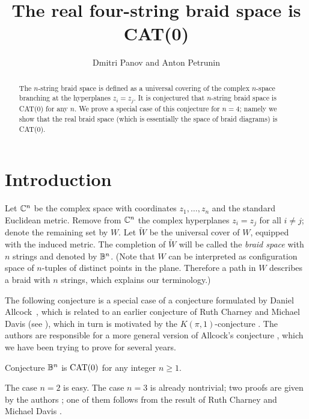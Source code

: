 \documentclass[a4paper,10pt]{article}
\def\thetitle{The real four-string braid space is CAT(0)}
\def\theauthors{Dmitri Panov and Anton Petrunin}
\begin{document}
\title{\thetitle}
\author{\theauthors}
\date{}
\maketitle

\begin{abstract}
The $n$-string braid space is defined as a universal covering of the complex $n$-space branching at the hyperplanes $z_i=z_j$.
It is conjectured that $n$-string braid space is CAT(0) for any $n$.
We prove a special case of this conjecture for $n=4$; namely we show that the real braid space (which is essentially the space of braid diagrams) is CAT(0).
\end{abstract}

\section{Introduction}

Let $\mathbb{C}^n$ be the complex space
with coordinates $z_1,\dots,z_n$ and the standard Euclidean metric.
Remove from $\mathbb{C}^n$ the complex hyperplanes $z_i=z_j$ for all $i\ne j$;
denote the remaining set by $W$.
Let $\tilde W$ be the universal cover of $W$, equipped with the induced metric.
The completion of $\tilde W$ will be called the \emph{braid space}
with $n$ strings and denoted by $\mathbb{B}^n$.
(Note that $W$ can be interpreted as configuration space of $n$-tuples of distinct points in the plane.
Therefore a path in $W$ describes a braid with $n$ strings, which explains our terminology.)

The following conjecture is a special case of a conjecture formulated by Daniel Allcock~\cite[Conjecture 1.4]{allcock}, which is related to an earlier conjecture of Ruth Charney and Michael Davis (see \cite[Conjecture 3]{charney-davis-95}), which in turn is motivated by the $K(\pi,1)$-conjecture \cite{vanderlek,paris}.
The authors are responsible for a more general version of Allcock's conjecture \cite[Conjecture 1.1]{panov-petrunin}, which we have been trying to prove for several years.

\begin{thm}{Conjecture}\label{braid-conj}
$\mathbb{B}^n$ is $\operatorname{\rm CAT}(0)$ for any integer $n\ge 1$.
\end{thm}

The case $n=2$ is easy.
The case $n=3$ is already nontrivial;
two proofs are given by the authors \cite{panov-petrunin};
one of them follows from the result of Ruth Charney and Michael Davis \cite{charney-davis-93}.
\end{document}

